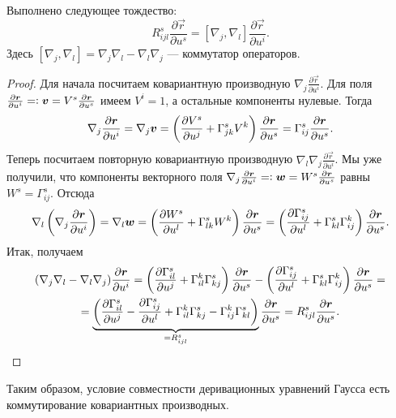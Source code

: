 \begin{lemma} \label{lemma:Rsijl}
	Выполнено следующее тождество:
	\[
		R^s_{ijl}\frac{\partial\vec{r}}{\partial u^s} = [\nabla_j, \nabla_l]\frac{\partial\vec{r}}{\partial u^i}.
	\]
	Здесь $[\nabla_j, \nabla_l] = \nabla_j\nabla_l - \nabla_l\nabla_j$ --- коммутатор операторов.
\end{lemma}

\begin{proof}
	Для начала посчитаем ковариантную производную $\nabla_j\frac{\partial\vec{r}}{\partial u^i}$. Для поля $\frac{\partial\vec{r}}{\partial u^i} = \vcentcolon \vec{v} = V^s\frac{\partial\vec{r}}{\partial u^s}$ имеем $V^i = 1$, а остальные компоненты нулевые. Тогда
	\[
		\nabla_j\frac{\partial \vec{r}}{\partial u^i} = \nabla_j\vec{v} = \br{\frac{\partial V^s}{\partial u^j} + \Gamma_{jk}^sV^k}\frac{\partial\vec{r}}{\partial u^s} = \Gamma_{ij}^s\frac{\partial\vec{r}}{\partial u^s}.
	\]
	Теперь посчитаем повторную ковариантную производную $\nabla_l\nabla_j\frac{\partial\vec{r}}{\partial u^i}$. Мы уже получили, что компоненты векторного поля $\nabla_j\frac{\partial\vec{r}}{\partial u^i} = \vcentcolon \vec{w} = W^s\frac{\partial\vec{r}}{\partial u^s}$ равны $W^s = \Gamma_{ij}^s$. Отсюда
	\[
		\nabla_l\br{\nabla_j\frac{\partial\vec{r}}{\partial u^i}} = \nabla_l\vec{w} = \br{\frac{\partial W^s}{\partial u^l} + \Gamma_{lk}^sW^k}\frac{\partial\vec{r}}{\partial u^s} = \br{\frac{\partial\Gamma_{ij}^s}{\partial u^l} + \Gamma_{kl}^s\Gamma_{ij}^k}\frac{\partial\vec{r}}{\partial u^s}.
	\]
	Итак, получаем
	\begin{multline*}
		(\nabla_j\nabla_l - \nabla_l\nabla_j)\frac{\partial\vec{r}}{\partial u^i} = \br{\frac{\partial\Gamma_{il}^s}{\partial u^j} + \Gamma_{il}^k\Gamma_{kj}^s}\frac{\partial\vec{r}}{\partial u^s} - \br{\frac{\partial\Gamma_{ij}^s}{\partial u^l} + \Gamma_{kl}^s\Gamma_{ij}^k}\frac{\partial\vec{r}}{\partial u^s} =\\ = \underbrace{\br{\frac{\partial\Gamma_{il}^s}{\partial u^j} - \frac{\partial\Gamma_{ij}^s}{\partial u^l} + \Gamma_{il}^k\Gamma_{kj}^s - \Gamma_{ij}^k\Gamma_{kl}^s}}_{= R^s_{ijl}}\frac{\partial\vec{r}}{\partial u^s} = R^s_{ijl}\frac{\partial\vec{r}}{\partial u^s}.
	\end{multline*}
\end{proof}

Таким образом, условие совместности деривационных уравнений Гаусса есть коммутирование ковариантных производных.


